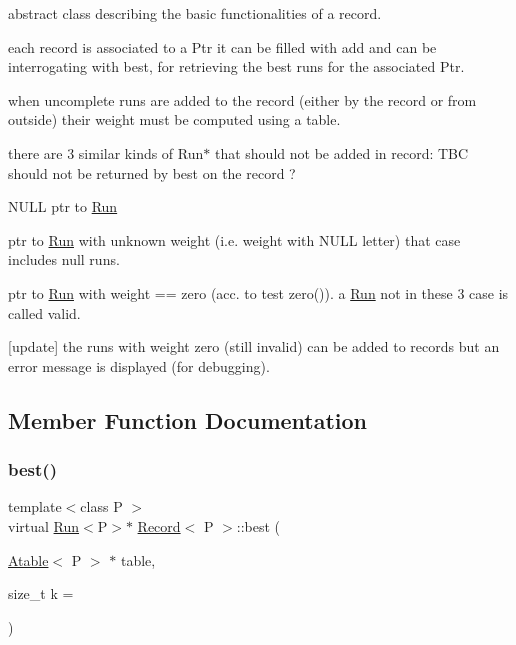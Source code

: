abstract class describing the basic functionalities of a record. 

each record is associated to a Ptr it can be filled with add and can be interrogating with best, for retrieving the best runs for the associated Ptr.

when uncomplete runs are added to the record (either by the record or from outside) their weight must be computed using a table.

there are 3 similar kinds of Run$\ast$ that should not be added in record\+: T\+BC should not be returned by best on the record ?
\begin{DoxyItemize}
\item N\+U\+LL ptr to \mbox{\hyperlink{classRun}{Run}}
\item ptr to \mbox{\hyperlink{classRun}{Run}} with unknown weight (i.\+e. weight with N\+U\+LL letter) that case includes null runs.
\item ptr to \mbox{\hyperlink{classRun}{Run}} with weight == zero (acc. to test zero()). a \mbox{\hyperlink{classRun}{Run}} not in these 3 case is called valid.
\end{DoxyItemize}

\mbox{[}update\mbox{]} the runs with weight zero (still invalid) can be added to records but an error message is displayed (for debugging). 

\subsection{Member Function Documentation}
\mbox{\label{classRecord_a767aeb8c69e0866328fc82e066af7c3b}} 
\subsubsection{\texorpdfstring{best()}{best()}}
{\footnotesize\ttfamily template$<$class P $>$ \\
virtual \mbox{\hyperlink{classRun}{Run}}$<$P$>$$\ast$ \mbox{\hyperlink{classRecord}{Record}}$<$ P $>$\+::best (\begin{DoxyParamCaption}\item[{\mbox{\hyperlink{classAtable}{Atable}}$<$ P $>$ $\ast$}]{table,  }\item[{size\+\_\+t}]{k = {} }\end{DoxyParamCaption})\hspace{0.3cm}{\ttfamily [pure virtual]}}



